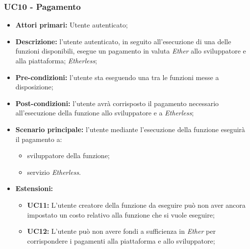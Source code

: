 \subsubsection{UC10 - Pagamento}
\begin{itemize}
	\item \textbf{Attori primari:} Utente autenticato;
	\item \textbf{Descrizione:} l'utente autenticato, in seguito all'esecuzione di una delle funzioni disponibili, esegue un pagamento in valuta \textit{Ether\glo} allo sviluppatore e alla piattaforma; \textit{Etherless}; 
	\item \textbf{Pre-condizioni:} l'utente sta eseguendo una tra le funzioni messe a disposizione;
	\item \textbf{Post-condizioni:} l'utente avrà corrisposto il pagamento necessario all'esecuzione della funzione allo sviluppatore e a \textit{Etherless};
	\item \textbf{Scenario principale:} l'utente mediante l'esecuzione della funzione eseguirà il pagamento a:
	\begin{itemize}
		\item sviluppatore della funzione;
		\item servizio \textit{Etherless}.
	\end{itemize}
	\item \textbf{Estensioni:} 
	\begin{itemize}
		\item \textbf{UC11:} L'utente creatore della funzione da eseguire può non aver ancora impostato un costo relativo alla funzione che si vuole eseguire;
		\item \textbf{UC12:} L'utente può non avere fondi a sufficienza in \textit{Ether\glo} per corrispondere i pagamenti alla piattaforma e allo sviluppatore;
	\end{itemize}
\end{itemize}